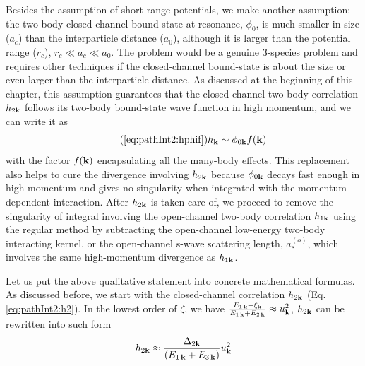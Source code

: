 Besides the assumption of short-range potentials, we make another assumption:  the  two-body closed-channel bound-state at resonance, $\phi_{0}$, is much smaller in size ($a_{c}$) than the interparticle distance ($a_{0}$), although it is  larger than the potential range ($r_{c}$),    $r_{c}\ll{}a_{c}\ll{}a_{0}$.  The problem would be a genuine 3-species problem and requires other techniques if the closed-channel bound-state is about the size  or even larger than the interparticle distance. As discussed at the beginning of this chapter, this assumption guarantees that the closed-channel two-body correlation $h_{2\mathbf{k}}$ follows its two-body bound-state wave function in high momentum, and  we can write it as 
\begin{equation}\tag{\ref{eq:pathInt2:hphif}}
h_{\vk}\sim\phi_{0\vk}f(\vk)
\end{equation}
with the factor $f(\mathbf{k})$ encapsulating all the many-body effects. This replacement also helps to  cure the divergence involving $h_{2\mathbf{k}}$ because $\phi_{0\mathbf{k}}$ decays fast enough in high momentum and gives no singularity when integrated with the momentum-dependent interaction.   After $h_{2\mathbf{k}}$ is taken care of, we proceed to remove the singularity of integral involving the open-channel two-body correlation $h_{1\mathbf{k}}$ using the regular method by subtracting the open-channel low-energy two-body interacting kernel, or the open-channel s-wave scattering length, $a_{s}^{(o)}$, which involves  the same high-momentum divergence as $h_{1\mathbf{k}}$. 



Let us put the above qualitative statement into concrete mathematical formulas.   As discussed before, we start with the closed-channel correlation $h_{2\mathbf{k}}$ (Eq. \ref{eq:pathInt2:h2}). In the lowest order of ${\zeta}$, we have $\frac{E_{1\,\mathbf{k}}+\xi_{\mathbf{k}}}{E_{1\,\mathbf{k}}+E_{2\,\mathbf{k}}}\approx{}u_{\mathbf{k}}^{2}$, $h_{2\mathbf{k}}$ can be rewritten into such form
\begin{equation}\label{eq:pathInt2:h2D2}
 h_{2\mathbf{k}}\approx\frac{\Delta_{2\mathbf{k}}}{(E_{1\,\mathbf{k}}+E_{3\,\mathbf{k}})}u_{\mathbf{k}}^{2}
\end{equation}

